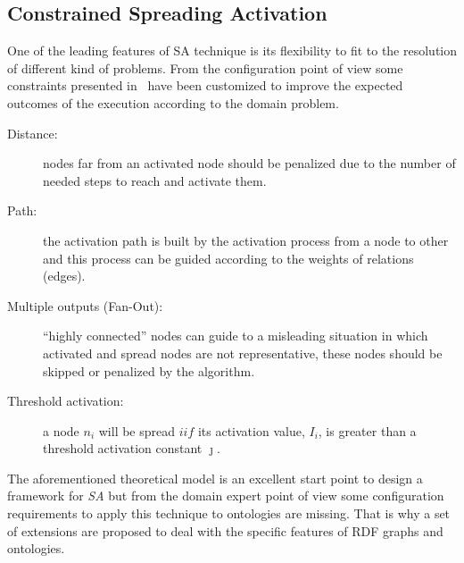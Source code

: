 \subsection{Constrained Spreading Activation}
One of the leading features of SA technique is its flexibility to fit to 
the resolution of different kind of problems. From the configuration point of view
some constraints presented in~\cite{Cohen1987} have been customized to improve
the expected outcomes of the execution according to the domain problem. 

\begin{description}

\item [Distance:] nodes far from an activated node should be penalized due to
the number of needed steps to reach and activate them.

\item [Path:] the activation path is built by the activation process from a node
to other and this process can be guided according to the weights of relations (edges). 

\item [Multiple outputs (Fan-Out):] ``highly connected'' nodes can 
guide to a misleading situation in which activated and spread nodes are not representative, these nodes
should be skipped or penalized by the algorithm.

\item [Threshold activation:] a node $n_i$ will be spread $iif$ its activation
value, $I_i$, is greater than a threshold activation constant $\jmath$.

\end{description}

The aforementioned theoretical model is an excellent start point to design
a framework for \textit{SA} but from the domain expert point of view some configuration
requirements to apply this technique to ontologies are missing. 
That is why a set of extensions are proposed to deal with the specific features 
of RDF graphs and ontologies.


